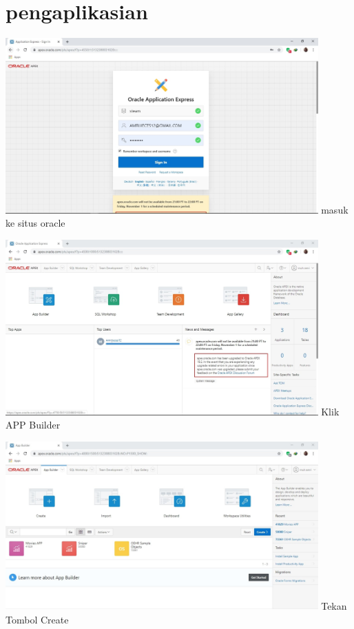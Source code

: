 \documentclass[12pt, times news roman, a4paper] {article}
\begin{document}
\section{pengaplikasian}
	\begin{minipage}{\linewidth}
		\centering
			\includegraphics[width=12cm]{Capture1.jpg} 
			 {masuk ke situs oracle}
	\end{minipage}

	\begin{minipage}{\linewidth}
	\centering
	\includegraphics[width=12cm]{Capture2.jpg} 
	 {Klik APP Builder}
\end{minipage}

	\begin{minipage}{\linewidth}
	\centering
	\includegraphics[width=12cm]{Capture3.jpg} 
	 {Tekan Tombol Create}
\end{minipage}
\end{document}
